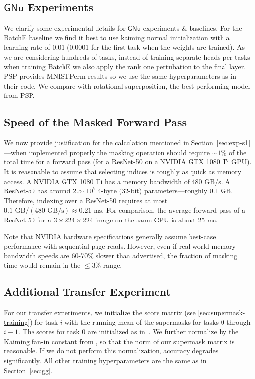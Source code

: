 \documentclass{article}
\newcommand{\casename}[1]{\ensuremath{\mathsf{#1}}\xspace}
\begin{document}
\subsection{\casename{GNu} Experiments}
We clarify some experimental details for \casename{GNu} experiments \& baselines. For the BatchE \cite{wen2020batchensemble} baseline we find it best to use kaiming normal initialization with a learning rate of 0.01 (0.0001 for the first task when the weights are trained). As we are considering hundreds of tasks, instead of training separate heads per tasks when training BatchE we also apply the rank one pertubation to the final layer. PSP \cite{cheung2019superposition} provides MNISTPerm results so we use the same hyperparameters as in their code. We compare with rotational superposition, the best performing model from PSP.

\subsection{Speed of the Masked Forward Pass}\label{sec}

We now provide justification for the calculation mentioned in Section~\ref{sec:exp-s1}---when implemented properly the masking operation should require $\sim 1\%$ of the total time for a forward pass (for a ResNet-50 on a NVIDIA GTX 1080 Ti GPU). It is reasonable to assume that selecting indices is roughly as quick as memory access. A NVIDIA GTX 1080 Ti has a memory bandwidth of 480 GB/s. A ResNet-50 has around $2.5\cdot 10^7$ 4-byte (32-bit) parameters---roughly 0.1 GB. Therefore, indexing over a ResNet-50 requires at most $0.1 \text{ GB} / \left(480\text{ GB/s}\right) \approx 0.21\text{ ms}$. For comparison, the average forward pass of a ResNet-50 for a $3\times 224\times 224$ image on the same GPU is about 25 ms. 

Note that NVIDIA hardware specifications generally assume best-case performance with sequential page reads. However, even if real-world memory bandwidth speeds are 60-70\% slower than advertised, the fraction of masking time would remain in the $\leq 3$\% range.

\subsection{Additional Transfer Experiment}

For our transfer experiments, we initialize the score matrix (see \autoref{sec:supermask-training}) for task $i$ with the running mean of the supermasks for tasks 0 through $i-1$. The scores for task 0 are initialized as in~\cite{ramanujan2019s}. We further normalize by the Kaiming fan-in constant from \cite{he2015delving}, so that the norm of our supermask matrix is reasonable. If we do not perform this normalization, accuracy degrades significantly. All other training hyperparameters are the same as in Section~\ref{sec:gg}. 
\end{document}
